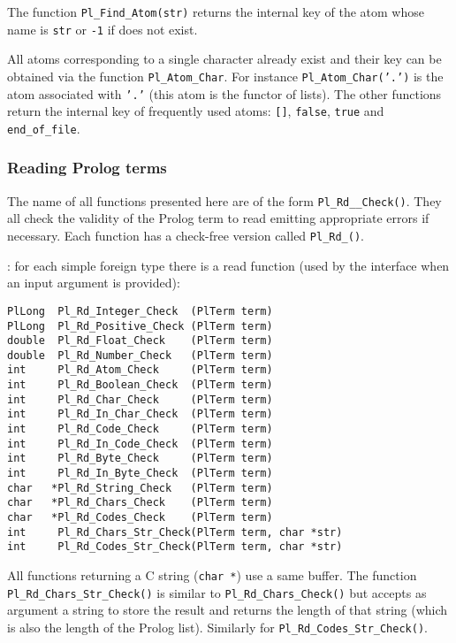 The function \texttt{Pl\_Find\_Atom(str)} returns the internal key of the
atom whose name is \texttt{str} or \texttt{-1} if does not exist.

All atoms corresponding to a single character already exist and their
key can be obtained via the function \texttt{Pl\_Atom\_Char}.  For
instance \texttt{Pl\_Atom\_Char('.')} is the atom associated with
\texttt{'.'} (this atom is the functor of lists). The other functions return
the internal key of frequently used atoms: \texttt{[]},
\texttt{false}, \texttt{true} and \texttt{end\_of\_file}.

\subsubsection{Reading Prolog terms}
\label{Reading-Prolog-terms}
The name of all functions presented here are of the form
\texttt{Pl\_Rd\_\_Check()}. They all check the validity of the
Prolog term to read emitting appropriate errors if necessary. Each function
has a check-free version called \texttt{Pl\_Rd\_()}.

: for each simple foreign type
 there is a read function (used by the
interface when an input argument is provided):

\begin{Indentation}
\begin{verbatim}
PlLong  Pl_Rd_Integer_Check  (PlTerm term)
PlLong  Pl_Rd_Positive_Check (PlTerm term)
double  Pl_Rd_Float_Check    (PlTerm term)
double  Pl_Rd_Number_Check   (PlTerm term)
int     Pl_Rd_Atom_Check     (PlTerm term)
int     Pl_Rd_Boolean_Check  (PlTerm term)
int     Pl_Rd_Char_Check     (PlTerm term)
int     Pl_Rd_In_Char_Check  (PlTerm term)
int     Pl_Rd_Code_Check     (PlTerm term)
int     Pl_Rd_In_Code_Check  (PlTerm term)
int     Pl_Rd_Byte_Check     (PlTerm term)
int     Pl_Rd_In_Byte_Check  (PlTerm term)
char   *Pl_Rd_String_Check   (PlTerm term)
char   *Pl_Rd_Chars_Check    (PlTerm term)
char   *Pl_Rd_Codes_Check    (PlTerm term)
int     Pl_Rd_Chars_Str_Check(PlTerm term, char *str)
int     Pl_Rd_Codes_Str_Check(PlTerm term, char *str)
\end{verbatim}
\end{Indentation}

All functions returning a C string (\texttt{char *}) use a same buffer. The
function \texttt{Pl\_Rd\_Chars\_Str\_Check()} is similar to
\texttt{Pl\_Rd\_Chars\_Check()} but accepts as argument a string to store the
result and returns the length of that string (which is also the length of
the Prolog list). Similarly for \texttt{Pl\_Rd\_Codes\_Str\_Check()}.

